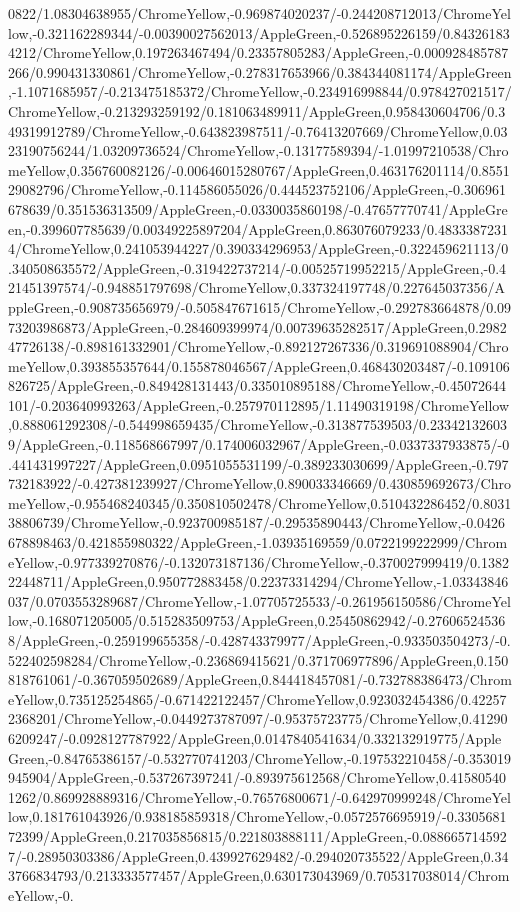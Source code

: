 {\begin{tikzternal}
0822/1.08304638955/ChromeYellow,-0.969874020237/-0.244208712013/ChromeYellow,-0.321162289344/-0.00390027562013/AppleGreen,-0.526895226159/0.843261834212/ChromeYellow,0.197263467494/0.23357805283/AppleGreen,-0.000928485787266/0.990431330861/ChromeYellow,-0.278317653966/0.384344081174/AppleGreen,-1.1071685957/-0.213475185372/ChromeYellow,-0.234916998844/0.978427021517/ChromeYellow,-0.213293259192/0.181063489911/AppleGreen,0.958430604706/0.349319912789/ChromeYellow,-0.643823987511/-0.76413207669/ChromeYellow,0.0323190756244/1.03209736524/ChromeYellow,-0.13177589394/-1.01997210538/ChromeYellow,0.356760082126/-0.00646015280767/AppleGreen,0.463176201114/0.855129082796/ChromeYellow,-0.114586055026/0.444523752106/AppleGreen,-0.306961678639/0.351536313509/AppleGreen,-0.0330035860198/-0.47657770741/AppleGreen,-0.399607785639/0.00349225897204/AppleGreen,0.863076079233/0.48333872314/ChromeYellow,0.241053944227/0.390334296953/AppleGreen,-0.322459621113/0.340508635572/AppleGreen,-0.319422737214/-0.00525719952215/AppleGreen,-0.421451397574/-0.948851797698/ChromeYellow,0.337324197748/0.227645037356/AppleGreen,-0.908735656979/-0.505847671615/ChromeYellow,-0.292783664878/0.0973203986873/AppleGreen,-0.284609399974/0.00739635282517/AppleGreen,0.298247726138/-0.898161332901/ChromeYellow,-0.892127267336/0.319691088904/ChromeYellow,0.393855357644/0.155878046567/AppleGreen,0.468430203487/-0.109106826725/AppleGreen,-0.849428131443/0.335010895188/ChromeYellow,-0.45072644101/-0.203640993263/AppleGreen,-0.257970112895/1.11490319198/ChromeYellow,0.888061292308/-0.544998659435/ChromeYellow,-0.313877539503/0.233421326039/AppleGreen,-0.118568667997/0.174006032967/AppleGreen,-0.0337337933875/-0.441431997227/AppleGreen,0.0951055531199/-0.389233030699/AppleGreen,-0.797732183922/-0.427381239927/ChromeYellow,0.890033346669/0.430859692673/ChromeYellow,-0.955468240345/0.350810502478/ChromeYellow,0.510432286452/0.803138806739/ChromeYellow,-0.923700985187/-0.29535890443/ChromeYellow,-0.0426678898463/0.421855980322/AppleGreen,-1.03935169559/0.0722199222999/ChromeYellow,-0.977339270876/-0.132073187136/ChromeYellow,-0.370027999419/0.138222448711/AppleGreen,0.950772883458/0.22373314294/ChromeYellow,-1.03343846037/0.0703553289687/ChromeYellow,-1.07705725533/-0.261956150586/ChromeYellow,-0.168071205005/0.515283509753/AppleGreen,0.25450862942/-0.276065245368/AppleGreen,-0.259199655358/-0.428743379977/AppleGreen,-0.933503504273/-0.522402598284/ChromeYellow,-0.236869415621/0.371706977896/AppleGreen,0.150818761061/-0.367059502689/AppleGreen,0.844418457081/-0.732788386473/ChromeYellow,0.735125254865/-0.671422122457/ChromeYellow,0.923032454386/0.422572368201/ChromeYellow,-0.0449273787097/-0.95375723775/ChromeYellow,0.412906209247/-0.0928127787922/AppleGreen,0.0147840541634/0.332132919775/AppleGreen,-0.84765386157/-0.532770741203/ChromeYellow,-0.197532210458/-0.353019945904/AppleGreen,-0.537267397241/-0.893975612568/ChromeYellow,0.415805401262/0.869928889316/ChromeYellow,-0.76576800671/-0.642970999248/ChromeYellow,0.181761043926/0.938185859318/ChromeYellow,-0.0572576695919/-0.330568172399/AppleGreen,0.217035856815/0.221803888111/AppleGreen,-0.0886657145927/-0.28950303386/AppleGreen,0.439927629482/-0.294020735522/AppleGreen,0.343766834793/0.213333577457/AppleGreen,0.630173043969/0.705317038014/ChromeYellow,-0.
\end{tikzternal}}
